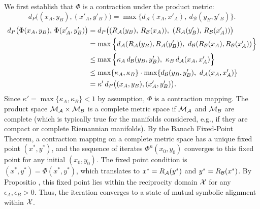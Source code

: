 \begin{demonstratio}
\label{demonstratio:bk7_joint_reflection_contraction}
We first establish that \( \Phi \) is a contraction under the product metric:
\[
d_P\big((x_A, y_B), (x'_A, y'_B)\big) 
= \max\big\{ d_{\mathcal{A}}(x_A, x'_A),\ d_{\mathcal{B}}(y_B, y'_B) \big\}.
\]
\begin{align*}
d_P\big(\Phi(x_A, y_B),\, \Phi(x'_A, y'_B)\big)
&= d_P\big(
  (\reflect_{\mathcal{A}}(y_B),\, \reflect_{\mathcal{B}}(x_A)),\ 
  (\reflect_{\mathcal{A}}(y'_B),\, \reflect_{\mathcal{B}}(x'_A))
\big) \\
&= \max\Big\{ 
  d_{\mathcal{A}}(\reflect_{\mathcal{A}}(y_B), \reflect_{\mathcal{A}}(y'_B)),\ 
  d_{\mathcal{B}}(\reflect_{\mathcal{B}}(x_A), \reflect_{\mathcal{B}}(x'_A)) 
\Big\} \\
&\le \max\Big\{ 
  \kappa_A\, d_{\mathcal{B}}(y_B, y'_B),\ 
  \kappa_B\, d_{\mathcal{A}}(x_A, x'_A) 
\Big\} \\
&\le \max\{\kappa_A, \kappa_B\} 
    \cdot \max\{ d_{\mathcal{B}}(y_B, y'_B),\ d_{\mathcal{A}}(x_A, x'_A) \} \\
&= \kappa'\, d_P\big((x_A, y_B), (x'_A, y'_B)\big).
\end{align*}
Since \( \kappa' = \max\{\kappa_A, \kappa_B\} < 1 \) by assumption, \( \Phi \) is a contraction mapping.
The product space \(\mathcal{M}_{\mathcal{A}}\times\mathcal{M}_{\mathcal{B}}\) is a complete metric space if \(\mathcal{M}_{\mathcal{A}}\) and \(\mathcal{M}_{\mathcal{B}}\) are complete (which is typically true for the manifolds considered, e.g., if they are compact or complete Riemannian manifolds).
By the Banach Fixed-Point Theorem, a contraction mapping on a complete metric space has a unique fixed point \((x^{\ast}, y^{\ast})\), and the sequence of iterates \(\Phi^n(x_0, y_0)\) converges to this fixed point for any initial \((x_0, y_0)\). The fixed point condition is \((x^{\ast}, y^{\ast}) = \Phi(x^{\ast}, y^{\ast})\), which translates to \(x^{\ast} = R_{\mathcal{A}}(y^{\ast})\) and \(y^{\ast} = R_{\mathcal{B}}(x^{\ast})\). By Propositio , this fixed point lies within the reciprocity domain \(\mathcal{X}\) for any \(\epsilon_A, \epsilon_B > 0\). Thus, the iteration converges to a state of mutual symbolic alignment within \(\mathcal{X}\).

\end{demonstratio}
